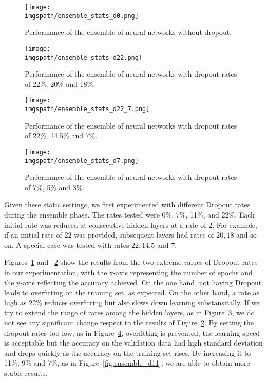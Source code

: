 \documentclass[conference]{IEEEtran}
\def\imgspath{./imgs}
\def\imgspath{../imgs}
\begin{document}
\begin{figure}[!ht]
	\centering
	\texttt{[image: \\imgspath/ensemble\_stats\_d0.png]}
	\caption{Performance of the ensemble of neural networks without dropout.}
	\label{fig:dropout_0}
\end{figure}

\begin{figure}[!ht]
	\centering
	\texttt{[image: \\imgspath/ensemble\_stats\_d22.png]}
	\caption{Performance of the ensemble of neural networks with dropout rates of 22\%, 20\% and 18\%.}
	\label{fig:dropout_22}
\end{figure}

\begin{figure}[!ht]
	\centering
	\texttt{[image: \\imgspath/ensemble\_stats\_d22\_7.png]}
	\caption{Performance of the ensemble of neural networks with dropout rates of 22\%, 14.5\% and 7\%.}
	\label{fig:dropout_22_7}
\end{figure}

\begin{figure}[!ht]
	\centering
	\texttt{[image: \\imgspath/ensemble\_stats\_d7.png]}
	\caption{Performance of the ensemble of neural networks with dropout rates of 7\%, 5\% and 3\%.}
	\label{fig:dropout_7}
\end{figure}

Given these static settings, we first experimented with different Dropout rates
during the ensemble phase. The rates tested were 0\%, 7\%, 11\%, and 22\%. Each
initial rate was reduced at consecutive hidden layers at a rate of $2$. For
example, if an initial rate of $22$ was provided, subsequent layers had rates of
$20, 18$ and so on. A special case was tested with rates $22, 14.5$ and $7$.

Figures~\ref{fig:dropout_0} and ~\ref{fig:dropout_22} show the results from the
two extreme values of Dropout rates in our experimentation, with the x-axis
representing the number of epochs and the y-axis reflecting the accuracy
achieved. On the one hand, not having Dropout leads to overfitting on the
training set, as expected. On the other hand, a rate as high as 22\% reduces
overfitting but also slows down learning substansitally. If we try to extend the
range of rates among the hidden layers, as in Figure~\ref{fig:dropout_22_7}, we
do not see any significant change respect to the results of
Figure~\ref{fig:dropout_22}. By setting the dropout rates too low, as in
Figure~\ref{fig:dropout_7}, overfitting is prevented, the learning speed is
acceptable but the accuracy on the validation data had high standard deviation
and drops quickly as the accuracy on the training set rises. By increasing it to
11\%, 9\% and 7\%, as in Figure~\ref{fig:ensemble_d11}, we are able to obtain
more stable results.
\end{document}

